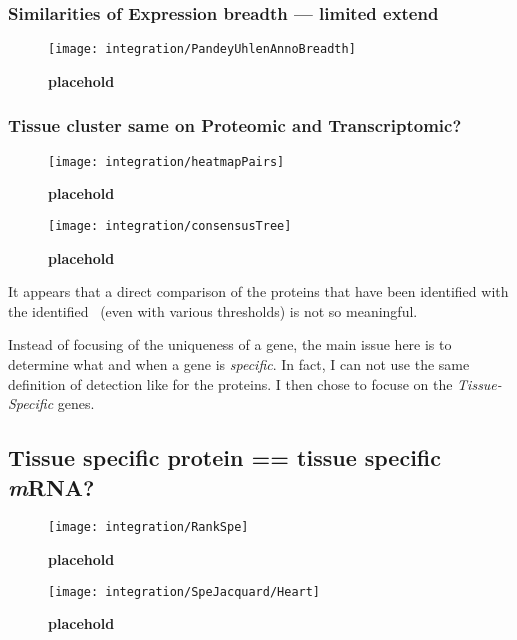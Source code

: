 \subsubsection{Similarities of Expression breadth --- limited extend }

\begin{figure}[!htbp]
\texttt{[image: integration/PandeyUhlenAnnoBreadth]}\centering
    \caption[placehold]{\label{fig:breadthColPandeyUhlen}\textbf{placehold}}
\end{figure}

\subsubsection{Tissue cluster same on Proteomic and Transcriptomic?}


\begin{figure}[!htbp]
\texttt{[image: integration/heatmapPairs]}\centering
    \caption[placehold]{\label{fig:bredthColPandeyUhlen}\textbf{placehold}}
\end{figure}

\begin{figure}[!htbp]
\texttt{[image: integration/consensusTree]}\centering
    \caption[placehold]{\label{fig:consensusTree}\textbf{placehold}}
\end{figure}

It appears that a direct comparison of the proteins that have been identified
with the identified \mRNAs\ (even with various thresholds) is not so meaningful.

Instead of focusing of the uniqueness of a gene, the main issue here is to
determine what and when a gene is \emph{specific}. In fact, I can not use
the same definition of detection like for the proteins. I then chose to focuse
on the \emph{Tissue-Specific} genes.

\subsection{Tissue specific protein == tissue specific \textit{m}RNA?}

\begin{figure}[!htbp]
\texttt{[image: integration/RankSpe]}\centering
    \caption[placehold]{\label{fig:RankSpe}\textbf{placehold}}
\end{figure}


\begin{figure}[!htbp]
\texttt{[image: integration/SpeJacquard/Heart]}\centering
    \caption[placehold]{\label{fig:ExJacquard}\textbf{placehold}}
\end{figure}


